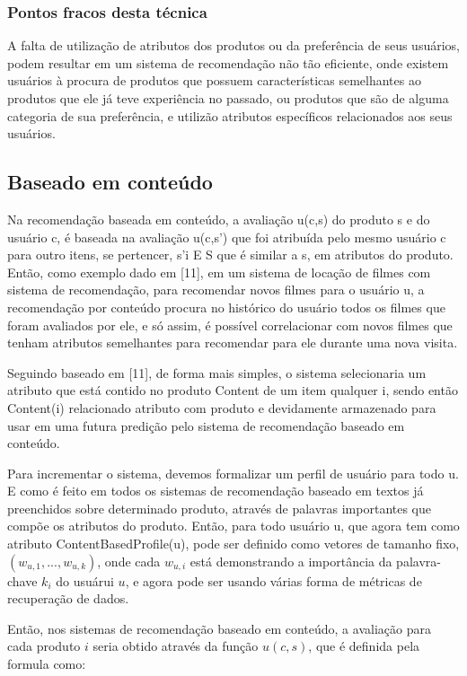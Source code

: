 \documentclass[12pt,
				openright,
				twoside,
				a4paper,
				apter=TITLE,
				section=TITLE,
				subsection=TITLE,
				chapter=TITLE,
				english,
				french,
				spanish,
				brazil]{abntex2}
\begin{document}
\subsubsection{Pontos fracos desta técnica}
A falta de utilização de atributos dos produtos ou da preferência de seus usuários, podem resultar em um sistema de recomendação não tão eficiente, onde existem usuários à procura de produtos que possuem características semelhantes ao produtos que ele já teve experiência no passado, ou produtos que são de alguma categoria de sua preferência, e utilizão atributos específicos relacionados aos seus usuários.


\subsection{Baseado em conteúdo}
Na recomendação baseada em conteúdo, a avaliação u(c,s) do produto s e do usuário c, é baseada na avaliação u(c,s') que foi atribuída pelo mesmo usuário c para outro itens, se pertencer, s'i E S que é similar a s, em atributos do produto. Então, como exemplo dado em [11], em um sistema de locação de filmes com sistema de recomendação, para recomendar novos filmes para o usuário u, a recomendação por conteúdo procura no histórico do usuário todos os filmes que foram avaliados por ele, e só assim, é possível correlacionar com novos filmes que tenham atributos semelhantes para recomendar para ele durante uma nova visita.

Seguindo baseado em [11], de forma mais simples, o sistema selecionaria um atributo que está contido no produto Content de um item qualquer i, sendo então Content(i) relacionado atributo com produto e devidamente armazenado para usar em uma futura predição pelo sistema de recomendação baseado em conteúdo.

Para incrementar o sistema, devemos formalizar um perfil de usuário para todo u. E como é feito em todos os sistemas de recomendação baseado em textos já preenchidos sobre determinado produto, através de palavras importantes que compõe os atributos do produto. Então, para todo usuário u, que agora tem como atributo ContentBasedProfile(u), pode ser definido
como vetores de tamanho fixo, $(w_{u,1}, ... , w_{u,k})$, onde cada $w_{u,i}$ está demonstrando a importância da palavra-chave $k_i$ do usuárui $u$, e agora pode ser usando várias forma de métricas de recuperação de dados. 

Então, nos sistemas de recomendação baseado em conteúdo, a avaliação para cada produto $i$ seria obtido através da função $u(c,s)$, que é definida pela formula como: 
\end{document}
